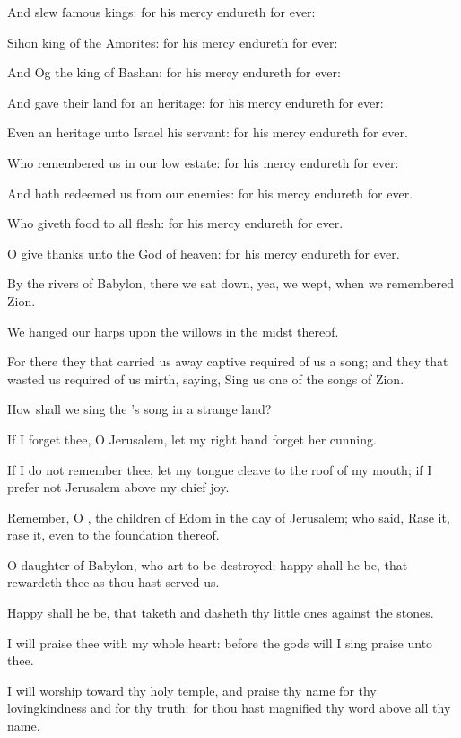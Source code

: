 \Verse And slew famous kings: for his mercy endureth for ever:

\Verse Sihon king of the Amorites: for his mercy endureth for ever:

\Verse And Og the king of Bashan: for his mercy endureth for ever:

\Verse And gave their land for an heritage: for his mercy endureth for ever:

\Verse Even an heritage unto Israel his servant: for his mercy endureth for ever.

\Verse Who remembered us in our low estate: for his mercy endureth for ever:

\Verse And hath redeemed us from our enemies: for his mercy endureth for ever.

\Verse Who giveth food to all flesh: for his mercy endureth for ever.

\Verse O give thanks unto the God of heaven: for his mercy endureth for ever.




\Chapter
\Verse By the rivers of Babylon, there we sat down, yea, we wept, when we remembered Zion.

\Verse We hanged our harps upon the willows in the midst thereof.

\Verse For there they that carried us away captive required of us a song; and they that wasted us required of us mirth, saying, Sing us one of the songs of Zion.

\Verse How shall we sing the \LORD's song in a strange land?

\Verse If I forget thee, O Jerusalem, let my right hand forget her cunning.

\Verse If I do not remember thee, let my tongue cleave to the roof of my mouth; if I prefer not Jerusalem above my chief joy.

\Verse Remember, O \LORD, the children of Edom in the day of Jerusalem; who said, Rase it, rase it, even to the foundation thereof.

\Verse O daughter of Babylon, who art to be destroyed; happy shall he be, that rewardeth thee as thou hast served us.

\Verse Happy shall he be, that taketh and dasheth thy little ones against the stones.




\Chapter
\Verse I will praise thee with my whole heart: before the gods will I sing praise unto thee.

\Verse I will worship toward thy holy temple, and praise thy name for thy lovingkindness and for thy truth: for thou hast magnified thy word above all thy name.

